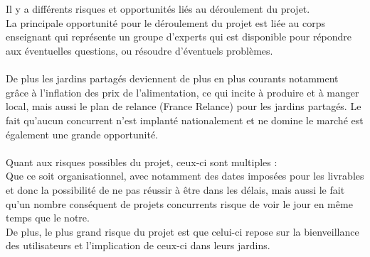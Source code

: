 \documentclass{report}
\begin{document}
\section*{\color{orange}{\Large Risques et opportunités}}
Il y a différents risques et opportunités liés au déroulement du projet. \\ 
La principale opportunité pour le déroulement du projet est liée au corps enseignant qui représente un groupe d'experts qui est disponible pour répondre aux éventuelles questions, ou résoudre d'éventuels problèmes. \\ \\ 
De plus les jardins partagés deviennent de plus en plus courants notamment grâce à l'inflation des prix de l’alimentation, ce qui incite à produire et à manger local, mais aussi le plan de relance (France Relance) pour les jardins partagés. Le fait qu'aucun concurrent n'est implanté nationalement et ne domine le marché est également une grande opportunité. \\  \\ 
Quant aux risques possibles du projet, ceux-ci sont multiples :  \\ 
Que ce soit organisationnel, avec notamment des dates imposées pour les livrables et donc la possibilité de ne pas réussir à être dans les délais, mais aussi le fait qu'un nombre conséquent de projets concurrents risque de voir le jour en même temps que le notre. \\ 
De plus, le plus grand risque du projet est que celui-ci repose sur la bienveillance des utilisateurs et l'implication de ceux-ci dans leurs jardins.
\end{document}
